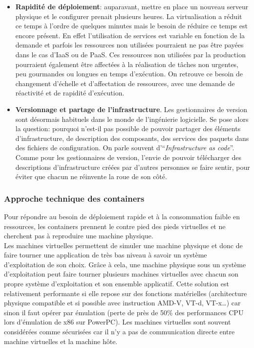 \begin{itemize}
            \item \textbf{Rapidité de déploiement}: auparavant, mettre en place un nouveau serveur physique et le configurer prenait plusieurs heures. La virtualisation a réduit ce temps à l'ordre de quelques minutes mais le besoin de réduire ce temps est encore présent. En effet l'utilisation de services est variable en fonction de la demande et parfois les ressources non utilisées pourraient ne pas être payées dans le cas d'IaaS ou de PaaS. Ces ressources non utilisées par la production pourraient également être affectées à la réalisation de tâches non urgentes, peu gourmandes ou longues en temps d'exécution. On retrouve ce besoin de changement d'échelle et d'affectation de ressources, avec une demande de réactivité et de rapidité d'exécution.
            \item \textbf{Versionnage et partage de l'infrastructure}. Les gestionnaires de version sont désormais habituels dans le monde de l'ingénierie logicielle. Se pose alors la question: pourquoi n'est-il pas possible de pouvoir partager des éléments d'infrastructure, de description des composants, des services des paquets dans des fichiers de configuration. On parle souvent d'\enquote{\textit{Infrastructure as code}}. Comme pour les gestionnaires de version, l'envie de pouvoir télécharger des descriptions d'infrastructure créées par d'autres personnes se faire sentir, pour éviter que chacun ne réinvente la roue de son côté.
        \end{itemize}

     \subsubsection*{Approche technique des containers}
        Pour répondre au besoin de déploiement rapide et à la consommation faible en ressources, les containers prennent le contre pied des pieds virtuelles et ne cherchent pas à reproduire une machine physique.\\

        Les machines virtuelles permettent de simuler une machine physique et donc de faire tourner une application de très bas niveau à savoir un système d'exploitation de son choix. Grâce à cela, une machine physique sous un système d'exploitation peut faire tourner plusieurs machines virtuelles avec chacun son propre système d'exploitation et son ensemble applicatif. Cette solution est relativement performante si elle repose sur des fonctions matérielles (architecture physique compatible et si possible avec instruction AMD-V, VT-d, VT-x\dots) car sinon il faut opérer par émulation (perte de près de 50\% des performances CPU lors d'émulation de x86 sur PowerPC)\cite{ipponDocker}. Les machines virtuelles sont souvent considérées comme sécurisées car il n'y a pas de communication directe entre machine virtuelles et la machine hôte.\\

